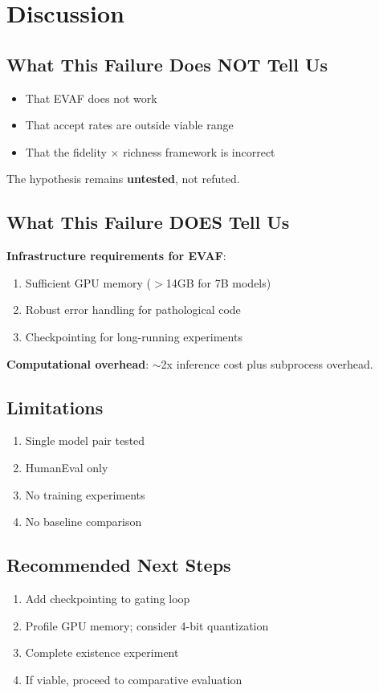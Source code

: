 \section{Discussion}
\label{sec:discussion}

\subsection{What This Failure Does NOT Tell Us}

\begin{itemize}
    \item That EVAF does not work
    \item That accept rates are outside viable range
    \item That the fidelity $\times$ richness framework is incorrect
\end{itemize}

The hypothesis remains \textbf{untested}, not refuted.

\subsection{What This Failure DOES Tell Us}

\textbf{Infrastructure requirements for EVAF}:
\begin{enumerate}
    \item Sufficient GPU memory ($>$14GB for 7B models)
    \item Robust error handling for pathological code
    \item Checkpointing for long-running experiments
\end{enumerate}

\textbf{Computational overhead}: $\sim$2x inference cost plus subprocess overhead.

\subsection{Limitations}

\begin{enumerate}
    \item Single model pair tested
    \item HumanEval only
    \item No training experiments
    \item No baseline comparison
\end{enumerate}

\subsection{Recommended Next Steps}

\begin{enumerate}
    \item Add checkpointing to gating loop
    \item Profile GPU memory; consider 4-bit quantization
    \item Complete existence experiment
    \item If viable, proceed to comparative evaluation
\end{enumerate}
